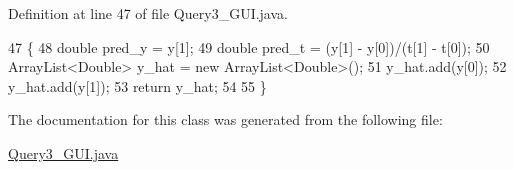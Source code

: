 Definition at line 47 of file Query3\-\_\-\-G\-U\-I.\-java.


\begin{DoxyCode}
47                                                                                       \{
48         \textcolor{keywordtype}{double} pred\_y = y[1];
49         \textcolor{keywordtype}{double} pred\_t = (y[1] - y[0])/(t[1] - t[0]);
50         ArrayList<Double> y\_hat = \textcolor{keyword}{new} ArrayList<Double>();
51         y\_hat.add(y[0]);
52         y\_hat.add(y[1]);
53         \textcolor{keywordflow}{return} y\_hat;
54         
55     \}
\end{DoxyCode}


The documentation for this class was generated from the following file\-:\begin{DoxyCompactItemize}
\item 
\hyperlink{Query3__GUI_8java}{Query3\-\_\-\-G\-U\-I.\-java}\end{DoxyCompactItemize}
